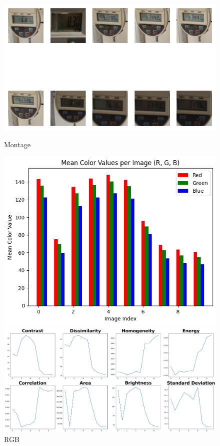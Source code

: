 \begin{figure}[ht]
    \centering
    \begin{minipage}[t]{0.25\textwidth}
        \centering
        \includegraphics[width=\textwidth]{Figures/EDA_Charts/4/montage.png}
        \caption*{Montage}
    \end{minipage}\hfill
    \begin{minipage}[t]{0.25\textwidth}
        \centering
        \includegraphics[width=\textwidth]{Figures/EDA_Charts/4/rgb.png}
        \caption*{RGB}
    \end{minipage}\hfill
    \begin{minipage}[t]{0.50\textwidth}
        \centering
        \includegraphics[width=\textwidth]{Figures/EDA_Charts/4/da.png}

\end{minipage}
\end{figure}
